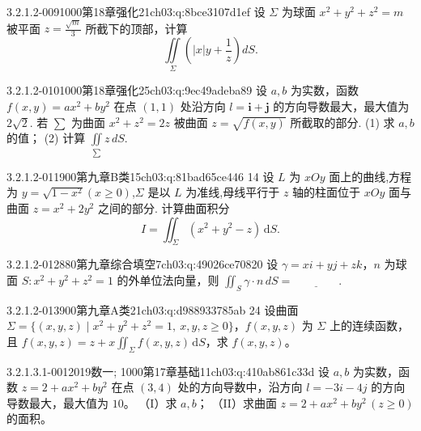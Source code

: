\begin{q}{3.2.1.2-009}{1000第18章强化21}{ch03:q:8bce3107d1ef}
设 $\Sigma$ 为球面 $x^2+y^2+z^2=m$ 被平面 $z=\frac{\sqrt{m}}{3}$ 所截下的顶部，计算 \[ \iint\limits_{\Sigma}\left(|x|y+\frac{1}{z}\right)dS. \]
\end{q}

\begin{q}{3.2.1.2-010}{1000第18章强化25}{ch03:q:9ec49adeba89}
设 $a,b$ 为实数，函数 $f(x,y)=ax^2+by^2$ 在点 $(1,1)$ 处沿方向 $l=\mathbf{i}+\mathbf{j}$ 的方向导数最大，最大值为 $2\sqrt{2}$. 若 $\displaystyle \sum$ 为曲面 $x^2+z^2=2z$ 被曲面 $z=\sqrt{f(x,y)}$ 所截取的部分.
(1) 求 $a,b$ 的值；
(2) 计算 $\displaystyle \iint\limits_{\sum} z\,dS$.
\end{q}

\begin{q}{3.2.1.2-011}{900第九章B类15}{ch03:q:81bad65ce446}
14 设 $L$ 为 $xOy$ 面上的曲线,方程为 $y=\sqrt{1-x^2}(x\ge0)$,$\Sigma$ 是以 $L$ 为准线,母线平行于 $z$ 轴的柱面位于 $xOy$ 面与曲面 $z=x^2+2y^2$ 之间的部分. 计算曲面积分 \[ I=\iint_{\Sigma}(x^2+y^2-z)\,\mathrm{d}S. \]
\end{q}

\begin{q}{3.2.1.2-012}{880第九章综合填空7}{ch03:q:49026ce70820}
设 $\gamma = xi + yj + zk$，$n$ 为球面 $S: x^2 + y^2 + z^2 = 1$ 的外单位法向量，则 $\displaystyle\iint_S \gamma \cdot n \, dS = \underline{\hspace{4em}}$.
\end{q}

\begin{q}{3.2.1.2-013}{900第九章A类21}{ch03:q:d988933785ab}
24 设曲面 $\Sigma = \{(x, y, z) \mid x^{2} + y^{2} + z^{2} = 1,\ x, y, z \geqslant 0\}$，$f(x, y, z)$ 为 $\Sigma$ 上的连续函数，且 $f(x, y, z) = z + x \displaystyle\iint_{\Sigma} f(x, y, z)\,\mathrm{d}S$，求 $f(x, y, z)$。
\end{q}

\par\addvspace{2.4ex}\noindent
\begin{minipage}{\linewidth}


\begin{q}{3.2.1.3.1-001}{2019数一; 1000第17章基础11}{ch03:q:410ab861c33d}
设 $a,b$ 为实数，函数 $z=2+ax^2+by^2$ 在点 $(3,4)$ 处的方向导数中，沿方向 $l=-3i-4j$ 的方向导数最大，最大值为 $10$。
（I）求 $a,b$；
（II）求曲面 $z=2+ax^2+by^2\,(z\ge0)$ 的面积。
\end{q}
\end{minipage}


